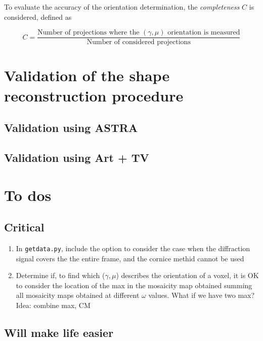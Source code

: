\documentclass[11pt]{scrartcl}
\begin{document}
To evaluate the accuracy of the orientation determination, the {\emph{completeness}} $C$ is considered, defined as 

\begin{equation}
    C = \frac{\text{Number of projections where the } (\gamma, \mu) \text{ orientation is measured}}{\text{Number of considered projections}}
\end{equation}

\section{Validation of the shape reconstruction procedure}

\subsection{Validation using ASTRA}

\subsection{Validation using Art + TV}

\section{To dos}

\subsection{Critical}

\begin{enumerate}
    \item In {\texttt{getdata.py}}, include the option to consider the case when the diffraction signal covers the the entire frame, and the cornice methid cannot be used
    \item Determine if, to find which ($\gamma, \mu$) describes the orientation of a voxel, it is {\footnotesize{OK}} to consider the location of the max in the mosaicity map obtained summing all mosaicity maps obtained at different $\omega$ values. What if we have two max? Idea: combine max, {\footnotesize{CM}}
\end{enumerate}

\subsection{Will make life easier}
\end{document}
